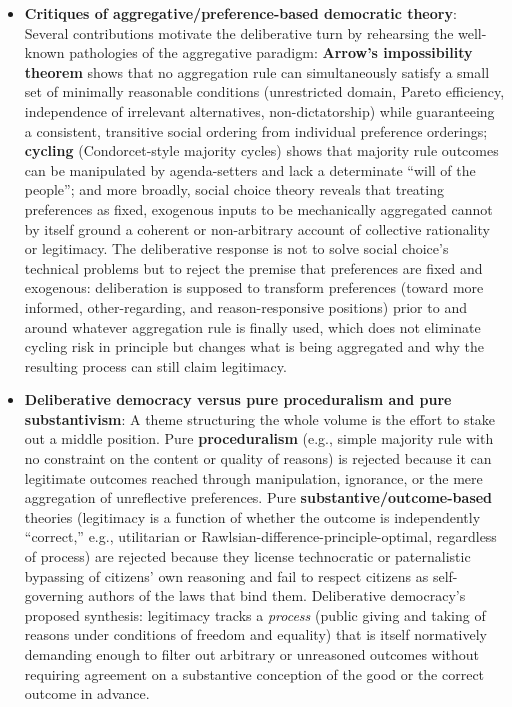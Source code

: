 \documentclass[12pt]{article}
\begin{document}
\begin{itemize}[leftmargin=*, itemsep=4pt]
    \item \textbf{Critiques of aggregative/preference-based democratic theory}: Several contributions motivate the deliberative turn by rehearsing the well-known pathologies of the aggregative paradigm: \textbf{Arrow's impossibility theorem} shows that no aggregation rule can simultaneously satisfy a small set of minimally reasonable conditions (unrestricted domain, Pareto efficiency, independence of irrelevant alternatives, non-dictatorship) while guaranteeing a consistent, transitive social ordering from individual preference orderings; \textbf{cycling} (Condorcet-style majority cycles) shows that majority rule outcomes can be manipulated by agenda-setters and lack a determinate ``will of the people''; and more broadly, social choice theory reveals that treating preferences as fixed, exogenous inputs to be mechanically aggregated cannot by itself ground a coherent or non-arbitrary account of collective rationality or legitimacy. The deliberative response is not to solve social choice's technical problems but to reject the premise that preferences are fixed and exogenous: deliberation is supposed to transform preferences (toward more informed, other-regarding, and reason-responsive positions) prior to and around whatever aggregation rule is finally used, which does not eliminate cycling risk in principle but changes what is being aggregated and why the resulting process can still claim legitimacy.
    \item \textbf{Deliberative democracy versus pure proceduralism and pure substantivism}: A theme structuring the whole volume is the effort to stake out a middle position. Pure \textbf{proceduralism} (e.g., simple majority rule with no constraint on the content or quality of reasons) is rejected because it can legitimate outcomes reached through manipulation, ignorance, or the mere aggregation of unreflective preferences. Pure \textbf{substantive/outcome-based} theories (legitimacy is a function of whether the outcome is independently ``correct,'' e.g., utilitarian or Rawlsian-difference-principle-optimal, regardless of process) are rejected because they license technocratic or paternalistic bypassing of citizens' own reasoning and fail to respect citizens as self-governing authors of the laws that bind them. Deliberative democracy's proposed synthesis: legitimacy tracks a \emph{process} (public giving and taking of reasons under conditions of freedom and equality) that is itself normatively demanding enough to filter out arbitrary or unreasoned outcomes without requiring agreement on a substantive conception of the good or the correct outcome in advance.
\end{itemize}
\end{document}
